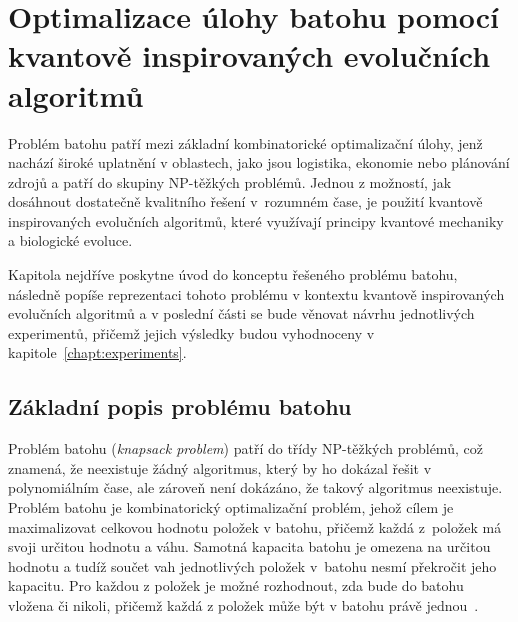 \chapter{Optimalizace úlohy batohu pomocí kvantově inspirovaných evolučních algoritmů}

Problém batohu patří mezi základní kombinatorické optimalizační úlohy, jenž nachází široké uplatnění v oblastech, jako jsou logistika, ekonomie nebo plánování zdrojů a patří do skupiny NP-těžkých problémů. 
Jednou z možností, jak dosáhnout dostatečně kvalitního řešení v~rozumném čase, je použití kvantově inspirovaných evolučních algoritmů, které využívají principy kvantové mechaniky a biologické evoluce. 

Kapitola nejdříve poskytne úvod do konceptu řešeného problému batohu, následně popíše reprezentaci tohoto problému v kontextu kvantově inspirovaných evolučních algoritmů a v poslední části se bude věnovat návrhu jednotlivých experimentů, přičemž jejich výsledky budou vyhodnoceny v kapitole~\ref{chapt:experiments}.

\section{Základní popis problému batohu}
Problém batohu (\emph{knapsack problem}) patří do třídy NP-těžkých problémů, což znamená, že neexistuje žádný algoritmus, který by ho dokázal řešit v polynomiálním čase, ale zároveň není dokázáno, že takový algoritmus neexistuje.
Problém batohu je kombinatorický optimalizační problém, jehož cílem je maximalizovat celkovou hodnotu položek v batohu, přičemž každá z~položek má svoji určitou hodnotu a váhu. 
Samotná kapacita batohu je omezena na určitou hodnotu a tudíž součet vah jednotlivých položek v~batohu nesmí překročit jeho kapacitu. 
Pro každou z položek je možné rozhodnout, zda bude do batohu vložena či nikoli, přičemž každá z položek může být v batohu právě jednou~\cite{ApproximationAlgorithms,IntroductionToAlgorithms}. 

